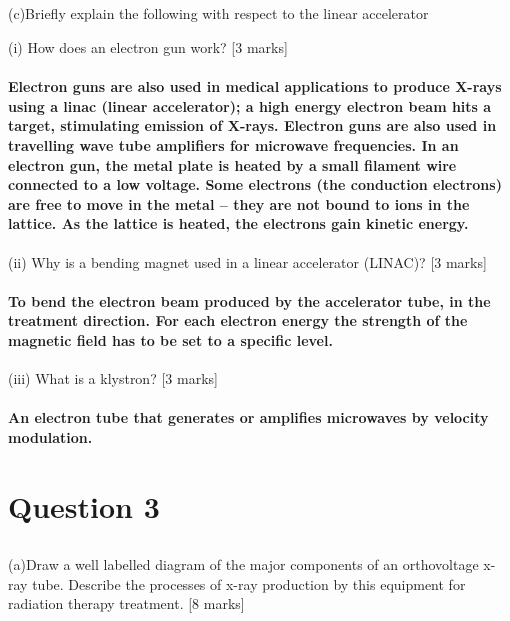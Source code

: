 \documentclass[11pt,letterpaper]{article}
\begin{document}
\subsection*{}(c)Briefly explain the following with respect to the linear accelerator

(i) How does an electron gun work? [3 marks]

\paragraph*{Electron guns are also used in medical applications to produce X-rays using a linac (linear accelerator); a high energy electron beam hits a target, stimulating emission of X-rays. Electron guns are also used in travelling wave tube amplifiers for microwave frequencies. In an electron gun, the metal plate is heated by a small filament wire connected to a low voltage. Some electrons (the conduction electrons) are free to move in the metal – they are not bound to ions in the lattice. As the lattice is heated, the electrons gain kinetic energy.}

(ii) Why is a bending magnet used in a linear accelerator (LINAC)? [3 marks]

\paragraph*{ To bend the electron beam produced by the accelerator tube, in the treatment direction. For each electron energy the strength of the magnetic field has to be set to a specific level.}

(iii) What is a klystron? [3 marks]

\paragraph*{An electron tube that generates or amplifies microwaves by velocity modulation.}
\newpage
\section{Question 3 }

\subsection*{}(a)Draw a well labelled diagram of the major components of an orthovoltage x-ray tube. Describe
the processes of x-ray production by this equipment for radiation therapy treatment. [8 marks]
\end{document}
